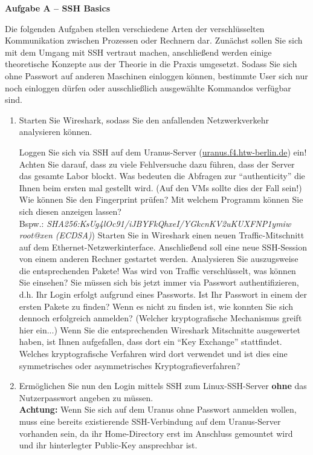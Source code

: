 \documentclass[paper=a4,fontsize=11pt]{scrartcl}%
\numberwithin{equation}{section}
\begin{document}
\begin{center}\Large{\textbf{Aufgabe A -- SSH Basics}}\end{center}\vskip0.25in
Die folgenden Aufgaben stellen verschiedene Arten der verschlüsselten Kommunikation zwischen Prozessen oder Rechnern dar. Zunächst sollen Sie sich mit dem Umgang mit SSH vertraut machen, anschließend werden einige theoretische Konzepte aus der Theorie in die Praxis umgesetzt. Sodass Sie sich ohne Passwort auf anderen Maschinen einloggen können, bestimmte User sich nur noch einloggen dürfen oder ausschließlich ausgewählte Kommandos verfügbar sind. 
\begin{enumerate}
\item Starten Sie Wireshark, sodass Sie den anfallenden Netzwerkverkehr analysieren können.
\begin{tasks}
	\task Loggen Sie sich via SSH auf dem Uranus-Server (\url{uranus.f4.htw-berlin.de}) ein! Achten Sie darauf, dass zu viele Fehlversuche dazu führen, dass der Server das gesamte Labor blockt.
	\task Was bedeuten die Abfragen zur \enquote{authenticity} die Ihnen beim ersten mal gestellt wird. (Auf den VMs sollte dies der Fall sein!)
	\task Wie können Sie den Fingerprint prüfen? Mit welchem Programm können Sie sich diesen anzeigen lassen?\\
	Bspw.: \small{ \emph{SHA256:KsUg4lOc91/iJBYFkQhxeI/YGkcnKV2uKUXFNP1ymiw root@xen (ECDSA)}})
	\task Starten Sie in Wireshark einen neuen Traffic-Mitschnitt auf dem Ethernet-Netzwerkinterface. Anschließend soll eine neue SSH-Session von einem anderen Rechner gestartet werden. Analysieren Sie auszugsweise die entsprechenden Pakete! Was wird von Traffic verschlüsselt, was können Sie einsehen? 
	\task Sie müssen sich bis jetzt immer via Passwort authentifizieren, d.h. Ihr Login erfolgt aufgrund eines Passworts. Ist Ihr Passwort in einem der ersten Pakete zu finden? Wenn es nicht zu finden ist, wie konnten Sie sich dennoch erfolgreich anmelden? (Welcher kryptografische Mechanismus greift hier ein...)
	\task Wenn Sie die entsprechenden Wireshark Mitschnitte ausgewertet haben, ist Ihnen aufgefallen, dass dort ein \enquote{Key Exchange} stattfindet. Welches kryptografische Verfahren wird dort verwendet und ist dies eine symmetrisches oder asymmetrisches Kryptografieverfahren?
\end{tasks}
	\item Ermöglichen Sie nun den Login mittels SSH zum Linux-SSH-Server \textbf{ohne} das Nutzerpasswort angeben zu müssen.\\
	\textbf{Achtung:} Wenn Sie sich auf dem Uranus ohne Passwort anmelden wollen, muss eine bereits existierende SSH-Verbindung auf dem Uranus-Server vorhanden sein, da ihr Home-Directory erst im Anschluss gemountet wird und ihr hinterlegter Public-Key ansprechbar ist.

\end{enumerate}
\end{document}
